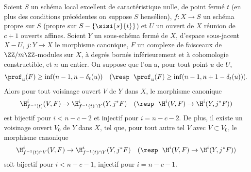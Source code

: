 \begin{proposition} \label{XIV.4.9}
Soient $S$ un sch\'ema local excellent de caract\'eristique nulle, de point ferm\'e $t$ (\resp en plus des conditions pr\'ec\'edentes on suppose $S$ hens\'elien), $f\colon X\to S$ un sch\'ema propre sur $S$ (\resp propre sur $S-\{ \sisi{s}{t}\}$) et $U$ un ouvert de $X$ r\'eunion de $c+1$ ouverts affines. Soient $Y$ un sous-sch\'ema ferm\'e de $X$, d'espace sous-jacent $X-U$, $j\colon Y\to X$ le morphisme canonique, $F$ un complexe de faisceaux de $\ZZ/m\ZZ$-modules sur $X$, \`a degr\'es born\'es inf\'erieurement et \`a cohomologie constructible, et $n$ un entier. On suppose que l'on a, pour tout point $u$ de $U$,
$$
\prof_{u}(F)\geq\inf(n-1, n-\delta_{t}(u))\quad(\textrm{\resp }\;\prof_{u}(F)\geq\inf(n-1, n+1-\delta_{t}(u))).
$$
Alors pour tout voisinage ouvert $V$ de $Y$ dans $X$, le morphisme canonique\pageoriginale
$$
\H_{f^{-1}(t)}^{i}(V, F)\to\H_{f^{-1}(t)\cap Y}^{i}(Y, j^{\ast}F)\quad(\textrm{\resp }\;\H^{i}(V, F)\to\H^{i}(Y, j^{\ast}F))$$
est bijectif pour $i<n-c-2$ et injectif pour $i=n-c-2$. De plus, il existe un voisinage ouvert $V_{0}$ de $Y$ dans $X$, tel que, pour tout autre tel $V$ avec $V\subset V_{0}$, le morphisme canonique
$$
\H_{f^{-1}(t)\cap V}^{i}(V, F)\to\H_{f^{-1}(t)\cap Y}^{i}(Y, j^{\ast}F)\quad(\textrm{\resp }\;\H^{i}(V, F)\to\H^{i}(Y, j^{\ast}F))$$
soit bijectif pour $i<n-c-1$, injectif pour $i=n-c-1$.
\end{proposition}

